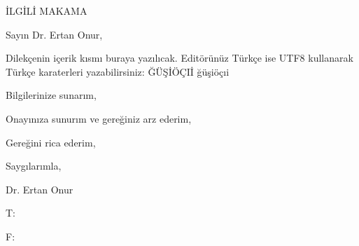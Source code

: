 \documentclass[11pt,a4paper]{article}
\begin{document}


\begin{center}
İLGİLİ MAKAMA\\
\end{center}
\vspace{0.5cm}

Sayın Dr. Ertan Onur,

Dilekçenin içerik kısmı buraya yazılıcak. Editörünüz Türkçe ise UTF8 kullanarak Türkçe karaterleri yazabilirsiniz: ĞÜŞİÖÇIİ ğüşiöçıi


\lipsum[1]

Bilgilerinize sunarım,

Onayınıza sunurım ve gereğiniz arz ederim,

Gereğini rica ederim,

Saygılarımla,

\vspace*{3cm}


\par\hspace{8cm} Dr. Ertan Onur
\par\hspace{8cm} \printemail
\par\hspace{8cm} \printweb
\par\hspace{8cm} T: \printtel
\par\hspace{8cm} F: \printfax
\end{document}
